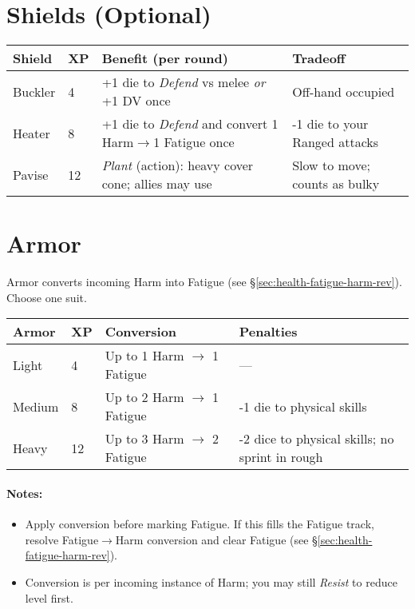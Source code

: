 \section{Shields (Optional)}
\label{app:shields}
\begin{center}
\begin{tabular}{llll}
\toprule
\textbf{Shield} & \textbf{XP} & \textbf{Benefit (per round)} & \textbf{Tradeoff} \\
\midrule
Buckler & 4 & +1 die to \emph{Defend} vs melee \emph{or} +1 DV once & Off-hand occupied \\
Heater  & 8 & +1 die to \emph{Defend} and convert 1 Harm$\rightarrow$1 Fatigue once & -1 die to your Ranged attacks \\
Pavise  & 12 & \emph{Plant} (action): heavy cover cone; allies may use & Slow to move; counts as bulky \\
\bottomrule
\end{tabular}
\end{center}

\section{Armor}
\label{app:armor}
Armor converts incoming Harm into Fatigue (see \S\ref{sec:health-fatigue-harm-rev}). Choose one suit.

\begin{center}
\begin{tabular}{llll}
\toprule
\textbf{Armor} & \textbf{XP} & \textbf{Conversion} & \textbf{Penalties} \\
\midrule
Light  & 4  & Up to 1 Harm $\rightarrow$ 1 Fatigue & — \\
Medium & 8  & Up to 2 Harm $\rightarrow$ 1 Fatigue & -1 die to physical skills \\
Heavy  & 12 & Up to 3 Harm $\rightarrow$ 2 Fatigue & -2 dice to physical skills; no sprint in rough \\
\bottomrule
\end{tabular}
\end{center}

\paragraph{Notes:}
\begin{itemize}
  \item Apply conversion before marking Fatigue. If this fills the Fatigue track, resolve Fatigue$\rightarrow$Harm conversion and clear Fatigue (see \S\ref{sec:health-fatigue-harm-rev}).
  \item Conversion is per incoming instance of Harm; you may still \emph{Resist} to reduce level first.
\end{itemize}

